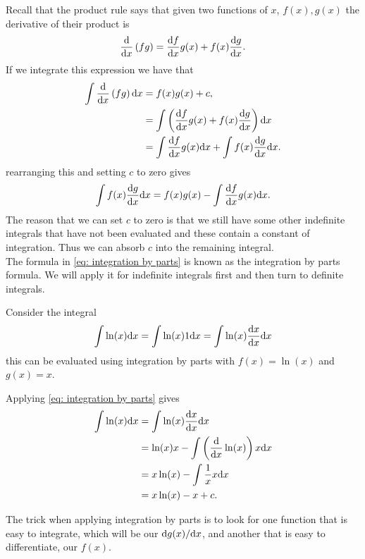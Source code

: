 Recall that the product rule says that given two functions of $x$, $f(x),g(x)$ the derivative of their product is 
\begin{equation*}
\frac{\mathrm{d} }{\mathrm{d} x}\left(fg\right)=\frac{\mathrm{d} f}{\mathrm{d} x}g(x)+f(x)\frac{\mathrm{d} g}{\mathrm{d} x}.
\end{equation*}
If we integrate this expression we have that
\begin{align*}
\int \frac{\mathrm{d} }{\mathrm{d} x}\left(fg\right)\mathrm{d} x 	&=f(x)g(x)+c,\\
								&=\int \left(\frac{\mathrm{d} f}{\mathrm{d} x}g(x)+f(x)\frac{\mathrm{d} g}{\mathrm{d} x}\right)\mathrm{d} x\\
								&=\int \frac{\mathrm{d} f}{\mathrm{d} x}g(x)\mathrm{d} x+\int f(x)\frac{\mathrm{d} g}{\mathrm{d} x}\mathrm{d} x.
\end{align*}
rearranging this and setting $c$ to zero gives
\begin{equation}
\int f(x)\frac{\mathrm{d} g}{\mathrm{d} x}\mathrm{d} x=f(x)g(x)-\int \frac{\mathrm{d} f}{\mathrm{d} x}g(x)\mathrm{d} x.
\label{eq: integration by parts}
\end{equation}
The reason that we can set $c$ to zero is that we still have some other indefinite integrals that have not been evaluated and these contain a constant of integration. Thus we can absorb $c$ into the remaining integral.\\

The formula in \cref{eq: integration by parts} is known as the integration by parts formula. We will apply it for indefinite integrals first and then turn to definite integrals.\\

\begin{ex}
Consider the integral
\begin{equation*}
\int \ln(x)\mathrm{d} x=\int \ln(x) 1 \mathrm{d} x=\int \ln(x)\frac{\mathrm{d} x}{\mathrm{d} x}\mathrm{d} x
\end{equation*}
this can be evaluated using integration by parts with $f(x)=\ln(x)$ and $g(x)=x$.

Applying \cref{eq: integration by parts}  gives
\begin{align*}
\int \ln(x)\mathrm{d} x 	&=\int \ln(x)\frac{\mathrm{d} x}{\mathrm{d} x}\mathrm{d} x\\
			&=\ln(x) x -\int \left(\frac{\mathrm{d}}{\mathrm{d} x}\ln(x)\right)x\mathrm{d} x\\
			&=x\ln(x)-\int \frac{1}{x}x \mathrm{d} x\\
			&=x\ln(x)-x+c.
\end{align*}
\end{ex}

The trick when applying integration by parts is to look for one function that is easy to integrate, which will be our $\mathrm{d} g(x)/\mathrm{d} x$, and another that is easy to differentiate, our $f(x)$.

